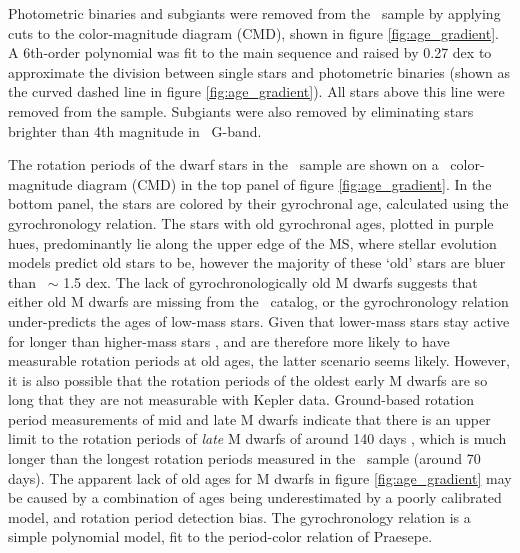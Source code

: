 Photometric binaries and subgiants were removed from the \mct\ sample by
applying cuts to the color-magnitude diagram (CMD), shown in figure
\ref{fig:age_gradient}.
A 6th-order polynomial was fit to the main sequence and raised by 0.27 dex to
approximate the division between single stars and photometric binaries (shown
as the curved dashed line in figure \ref{fig:age_gradient}).
All stars above this line were removed from the sample.
Subgiants were also removed by eliminating stars brighter than 4th magnitude
in \gaia\ G-band.

The rotation periods of the dwarf stars in the \mct\ sample are shown on a
\gaia\ color-magnitude diagram (CMD) in the top panel of figure
\ref{fig:age_gradient}.
In the bottom panel, the stars are colored by their gyrochronal age,
calculated using the \citet{angus2019} gyrochronology relation.
The stars with old gyrochronal ages, plotted in purple hues, predominantly lie
along the upper edge of the MS, where stellar evolution models predict old
stars to be, however the majority of these `old' stars are bluer than \gcolor\
$\sim$ 1.5 dex.
The lack of gyrochronologically old M dwarfs suggests that either old M dwarfs
are missing from the \mct\ catalog, or the \citet{angus2019} gyrochronology
relation under-predicts the ages of low-mass stars.
Given that lower-mass stars stay active for longer than higher-mass stars
\citep[\eg][]{west2011, kiman2019}, and are therefore more likely to have
measurable rotation periods at old ages, the latter scenario seems likely.
However, it is also possible that the rotation periods of the oldest early M
dwarfs are so long that they are not measurable with Kepler data.
Ground-based rotation period measurements of mid and late M dwarfs indicate
that there is an upper limit to the rotation periods of {\it late} M dwarfs of
around 140 days \citep{newton2016, newton2017, newton2018}, which is much
longer than the longest rotation periods measured in the \mct\ sample (around
70 days).
The apparent lack of old ages for M dwarfs in figure \ref{fig:age_gradient}
may be caused by a combination of ages being underestimated by a poorly
calibrated model, and rotation period detection bias.
The \citet{angus2019} gyrochronology relation is a simple polynomial model,
fit to the period-color relation of Praesepe.
